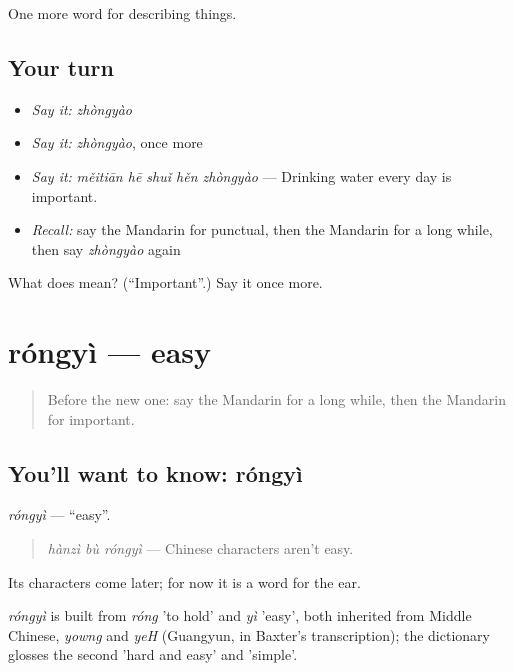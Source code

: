 \begin{grammarlens}[title={What you've built}]
One more word for describing things.
\end{grammarlens}

\subsection*{Your turn}
\begin{itemize}
\raggedright
  \item \emph{Say it:} \emph{zhòngyào}
  \item \emph{Say it:} \emph{zhòngyào}, once more
  \item \emph{Say it:} \emph{měitiān hē shuǐ hěn zhòngyào} — Drinking water every day is important.
  \item \emph{Recall:} say the Mandarin for punctual, then the Mandarin for a long while, then say \emph{zhòngyào} again
\end{itemize}

\begin{tcolorbox}[breakable,colback=teal!4,colframe=teal!35!black,title={Before you move on}]
What does  mean? (\textquotedblleft{}Important\textquotedblright{}.) Say it once more.
\end{tcolorbox}
\section[róngyì]{róngyì — easy}

\label{lesson:ZH-C144-rongyi}



\begin{quote}
Before the new one: say the Mandarin for a long while, then the Mandarin for important.
\end{quote}

\subsection*{You'll want to know: róngyì}
\emph{róngyì} — \textquotedblleft{}easy\textquotedblright{}.

\begin{quote}
\emph{hànzì bù róngyì} — Chinese characters aren't easy.
\end{quote}

Its characters come later; for now it is a word for the ear.

\begin{cousinweb}
\emph{róngyì} is built from \emph{róng} 'to hold' and \emph{yì} 'easy', both inherited from Middle Chinese, \emph{yowng} and \emph{yeH} (Guangyun, in Baxter's transcription); the dictionary glosses the second 'hard and easy' and 'simple'.
\end{cousinweb}

